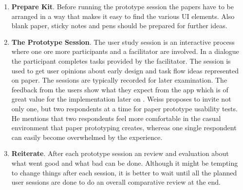 \begin{enumerate}
	
	\item \textbf{Prepare Kit}. Before running the prototype session the papers have to be arranged in a way that makes it easy to find the various UI elements. Also blank paper, sticky notes and pens should be prepared for further ideas.
	\item \textbf{The Prototype Session}. The user study session is an interactive process where one ore more participants and a facilitator are involved. In a dialogue the participant completes tasks provided by the facilitator. The session is used to get user opinions about early design and task flow ideas represented on paper. The sessions are typically recorded for later examination. The feedback from the users show what they expect from the app which is of great value for the implementation later on \cite{snyder2003paper}. Weiss  \cite[p.~144]{weiss2003handheld} proposes to invite not only one, but two respondents at a time for paper prototype usability tests. He mentions that two respondents feel more comfortable in the casual environment that paper prototyping creates, whereas one single respondent can easily become overwhelmed by the experience.
	\item \textbf{Reiterate}. After each prototype session an review and evaluation about what went good and what bad can be done. Although it might be tempting to change things after each session, it is better to wait until all the planned user sessions are done to do an overall comparative review at the end.
\end{enumerate}
